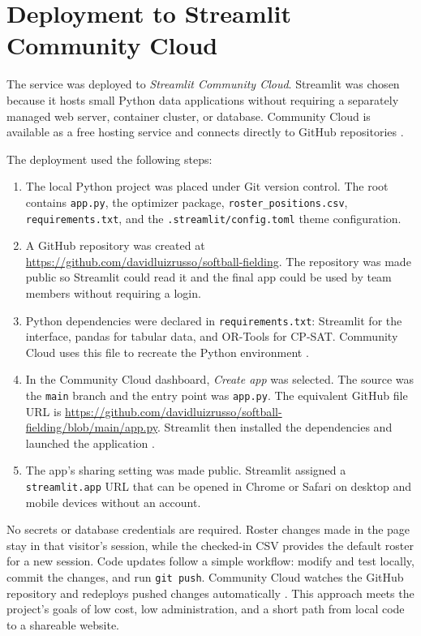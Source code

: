 \documentclass[11pt]{article}
\newcommand{\code}[1]{\texttt{#1}}
\begin{document}
\appendix
\section{Deployment to Streamlit Community Cloud}

The service was deployed to \emph{Streamlit Community Cloud}. Streamlit was
chosen because it hosts
small Python data applications without requiring a separately managed web
server, container cluster, or database. Community Cloud is available as a free
hosting service and connects directly to GitHub repositories
\cite{streamlitcloud}.

The deployment used the following steps:
\begin{enumerate}
    \item The local Python project was placed under Git version control. The
    root contains \code{app.py}, the optimizer package,
    \code{roster\_positions.csv}, \code{requirements.txt}, and the
    \code{.streamlit/config.toml} theme configuration.
    \item A GitHub repository was created at
    \url{https://github.com/davidluizrusso/softball-fielding}. The repository
    was made public so Streamlit could read it and the final app could be used
    by team members without requiring a login.
    \item Python dependencies were declared in \code{requirements.txt}:
    Streamlit for the interface, pandas for tabular data, and OR-Tools for
    CP-SAT. Community Cloud uses this file to recreate the Python environment
    \cite{streamlitdeps}.
    \item In the Community Cloud dashboard, \emph{Create app} was selected.
    The source was the \code{main} branch and the entry point was
    \code{app.py}. The equivalent GitHub file URL is
    \url{https://github.com/davidluizrusso/softball-fielding/blob/main/app.py}.
    Streamlit then installed the dependencies and launched the application
    \cite{streamlitdeploy}.
    \item The app's sharing setting was made public. Streamlit assigned a
    \code{streamlit.app} URL that can be opened in Chrome or Safari on desktop
    and mobile devices without an account.
\end{enumerate}

No secrets or database credentials are required. Roster changes made in the
page stay in that visitor's session, while the checked-in CSV provides the
default roster for a new session. Code updates follow a simple workflow:
modify and test locally, commit the changes, and run \code{git push}. Community
Cloud watches the GitHub repository and redeploys pushed changes automatically
\cite{streamlitmanage}. This approach meets the project's goals of low cost,
low administration, and a short path from local code to a shareable website.
\end{document}

